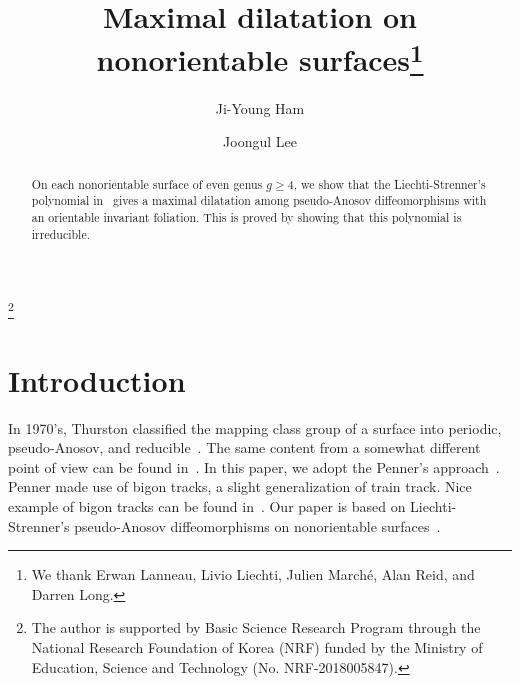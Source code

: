 \documentclass{amsart}
\theoremstyle{definition}
\theoremstyle{remark}
\begin{document}
\title[Maximal dilatation]{Maximal dilatation on nonorientable surfaces\thanks{We thank Erwan Lanneau, Livio Liechti, Julien Marché, Alan Reid, and Darren Long.}}
\author[J. Ham]{Ji-Young Ham}
\address{Department of Mathematics, Kangwon National University, 1 Kangwondaehakgil, Chuncheon-si, Gangwon state, 24341\\
School of Liberal Arts, Seoul National University of Science and Technology, 232 Gongneung-ro, Nowon-gu, Seoul, 01811\\
  Korea} 
\thanks{The author is supported by Basic Science Research Program through the National Research Foundation of Korea (NRF) funded by the Ministry of Education, Science and Technology (No. NRF-2018005847).}

\author[J. Lee]{Joongul Lee}
\address{Department of Mathematics Education, Hongik University\\
94 Wausan-ro, Mapo-gu, Seoul 04066\\
   Korea}



\begin{abstract}
 On each nonorientable surface of even genus $g \geq 4$, we show that the Liechti-Strenner's polynomial in~\cite{LiechtiStrenner18} gives a maximal dilatation among pseudo-Anosov diffeomorphisms with an orientable invariant foliation. This is proved by showing that this polynomial is irreducible.
 \end{abstract}
\maketitle


\section{Introduction}
In 1970's, Thurston classified the mapping class group of a surface into periodic, pseudo-Anosov, and reducible~\cite{Thurston88}. The same content from a somewhat different point of view can be found in~\cite{CassonBleiler88}. In this paper, we adopt the Penner's approach~\cite{Penner88,Penner91}. Penner made use of bigon tracks, a slight generalization of train track. Nice example of bigon tracks can be found in~\cite{LiechtiStrenner18-1}. Our paper is based on 
Liechti-Strenner's pseudo-Anosov diffeomorphisms on nonorientable surfaces~\cite{LiechtiStrenner18}.
\end{document}
